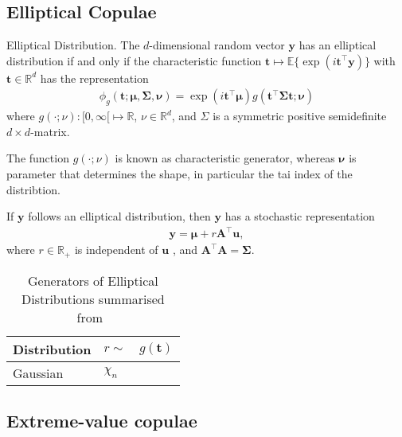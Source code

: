 \subsection{Elliptical Copulae}\label{subsec:elliptical-copulae}

\begin{definition}
    Elliptical Distribution.
    The $d$-dimensional random vector $\pmb{y}$ has an elliptical distribution if and only if the characteristic function
    $\pmb{t} \mapsto \mathbb{E}\{\exp(i\pmb{t}^\top \pmb{y})\}$ with $\pmb{t} \in \mathbb{R}^d$ has the representation
    \begin{align}
        \phi_g(\pmb{t}; \pmb{\mu}, \pmb{\Sigma}, \pmb{\nu}) = \exp(i\pmb{t}^\top\pmb{\mu})g(\pmb{t}^\top\pmb{\Sigma}\pmb{t};\pmb{\nu})
        \end{align}
    where $g(\cdot;\nu):[0, \infty[ \mapsto \mathbb{R}$, $\nu \in \mathbb{R}^d$, and $\Sigma$ is a symmetric positive semidefinite $d\times d$-matrix.
    \end{definition}

The function $g(\cdot; \nu)$ is known as characteristic generator, whereas $\pmb{\nu}$ is parameter that determines the shape, in particular the tai index of the distribtion.

\begin{corollary} \citep[equation 2.12]{fang2018symmetric}
    If $\pmb{y}$ follows an elliptical distribution, then $\pmb{y}$ has a stochastic representation
    \begin{align}
        \pmb{y} = \pmb{\mu} + r\pmb{A}^\top \pmb{u},
        \end{align}
    where $r \in \mathbb{R}_+$ is independent of
    $\pmb{u}$
    , and $\pmb{A}^\top\pmb{A}=\pmb{\Sigma}$.
    \end{corollary}

\begin{table}[ht]
    \center
    \begin{tabular}{lll}
    Distribution & $r \sim$ & $g(\pmb{t})$\\ \hline
    Gaussian & $\chi_n$ &
        \end{tabular}
    \caption{Generators of Elliptical Distributions summarised from~\cite[Chapter 2]{fang2018symmetric}}
    \label{tab:table}
\end{table}


\subsection{Extreme-value copulae}\label{subsec:extreme-value-copulae}
